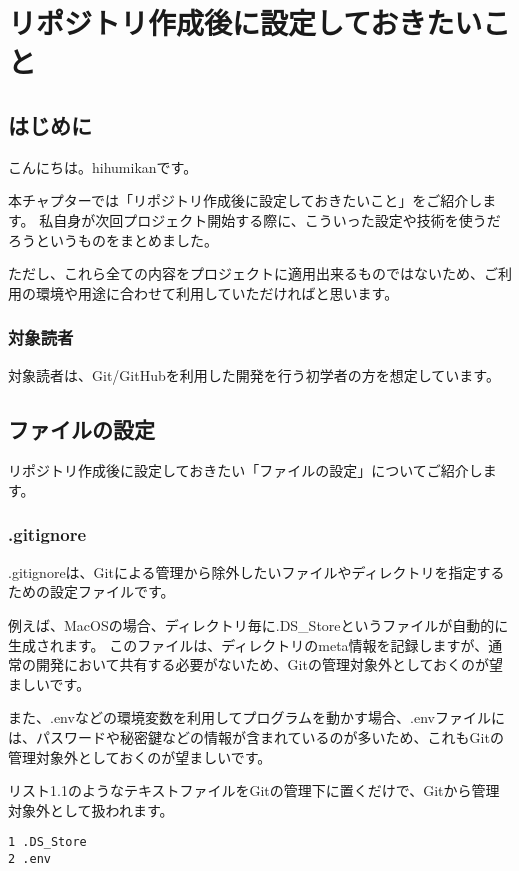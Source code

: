 \section{リポジトリ作成後に設定しておきたいこと}
\subsection{はじめに}
こんにちは。hihumikanです。

本チャプターでは「リポジトリ作成後に設定しておきたいこと」をご紹介します。
私自身が次回プロジェクト開始する際に、こういった設定や技術を使うだろうというものをまとめました。

ただし、これら全ての内容をプロジェクトに適用出来るものではないため、ご利用の環境や用途に合わせて利用していただければと思います。

\subsubsection{対象読者}

対象読者は、Git/GitHubを利用した開発を行う初学者の方を想定しています。

\subsection{ファイルの設定}

リポジトリ作成後に設定しておきたい「ファイルの設定」についてご紹介します。

\subsubsection{.gitignore}

.gitignoreは、Gitによる管理から除外したいファイルやディレクトリを指定するための設定ファイルです。

例えば、MacOSの場合、ディレクトリ毎に.DS\_Storeというファイルが自動的に生成されます。
このファイルは、ディレクトリのmeta情報を記録しますが、通常の開発において共有する必要がないため、Gitの管理対象外としておくのが望ましいです。

また、.envなどの環境変数を利用してプログラムを動かす場合、.envファイルには、パスワードや秘密鍵などの情報が含まれているのが多いため、これもGitの管理対象外としておくのが望ましいです。

リスト1.1のようなテキストファイルをGitの管理下に置くだけで、Gitから管理対象外として扱われます。

\begin{tcolorbox}[title=リスト1.1 .gitignore]
  \begin{verbatim}
1 .DS_Store
2 .env
\end{verbatim}
\end{tcolorbox}

